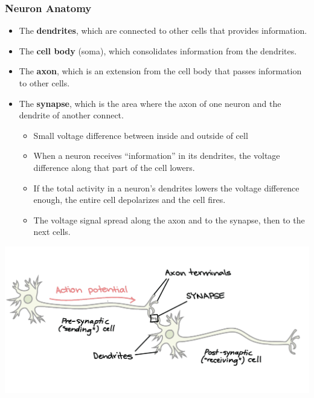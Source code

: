 \documentclass[11pt]{article}
\begin{document}
\subsubsection{Neuron Anatomy}
\begin{itemize}
\item The \textbf{dendrites}, which are connected to other cells that provides information.
\item The \textbf{cell body} (soma), which consolidates information from the dendrites.
\item The \textbf{axon}, which is an extension from the cell body that passes information to other cells.
\item The \textbf{synapse}, which is the area where the axon of one neuron and the dendrite of another connect.
\begin{itemize}
\item Small voltage difference between inside and outside of cell
\item When a neuron receives “information” in its dendrites, the voltage difference along that part of the cell lowers.
\item If the total activity in a neuron’s dendrites lowers the voltage difference enough, the entire cell depolarizes and the cell fires.
\item The voltage signal spread along the axon and to the synapse, then to the next cells.
\end{itemize}
\end{itemize}
\begin{center}
\includegraphics[scale=0.55]{images/synapse.png}
\end{center}
\end{document}
